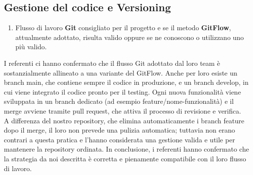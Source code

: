 \subsection{Gestione del codice e Versioning}
    \begin{enumerate}[resume*, itemsep=0pt, parsep=1pt, leftmargin=*, label=\arabic*.]
        \item Flusso di lavoro \textbf{Git} consigliato per il progetto e se il metodo \textbf{GitFlow}, attualmente adottato, risulta valido oppure se ne conoscono o utilizzano uno più valido.
    \end{enumerate} \vspace{-0.5em}
    I referenti ci hanno confermato che il flusso Git adottato dal loro team è sostanzialmente allineato a una variante del GitFlow. Anche per loro esiste un branch main, che contiene sempre il codice in produzione, e un branch develop, in cui viene integrato il codice pronto per il testing. Ogni nuova funzionalità viene sviluppata in un branch dedicato (ad esempio feature/nome-funzionalità) e il merge avviene tramite pull request, che attiva il processo di revisione e verifica.\\
    A differenza del nostro repository, che elimina automaticamente i branch feature dopo il merge, il loro non prevede una pulizia automatica; tuttavia non erano contrari a questa pratica e l’hanno considerata una gestione valida e utile per mantenere la repository ordinata. In conclusione, i referenti hanno confermato che la strategia da noi descritta è corretta e pienamente compatibile con il loro flusso di lavoro.
    
